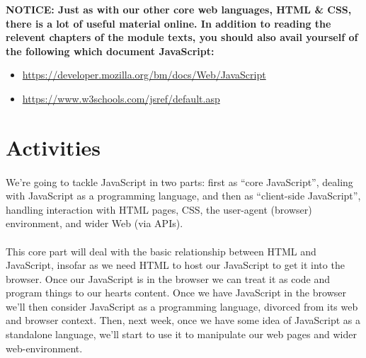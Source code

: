 \documentclass[10pt, a4paper]{article}
\begin{document}
\begin{framed}
{\bf{NOTICE:} Just as with our other core web languages, HTML \& CSS, there is a lot of useful material online. In addition to reading the relevent chapters of the module texts, you should also avail yourself of the following which document JavaScript:
\begin{itemize}
\item \url{https://developer.mozilla.org/bm/docs/Web/JavaScript}
\item \url{https://www.w3schools.com/jsref/default.asp}
\end{itemize}
  }
\end{framed}


\section{Activities}
\paragraph{} We're going to tackle JavaScript in two parts: first as ``core JavaScript'', dealing with JavaScript as a programming language, and then as ``client-side JavaScript'', handling interaction with HTML pages, CSS, the user-agent (browser) environment, and wider Web (via APIs).

\paragraph{} This core part will deal with the basic relationship between HTML and JavaScript, insofar as we need HTML to host our JavaScript to get it into the browser. Once our JavaScript is in the browser we can treat it as code and program things to our hearts content. Once we have JavaScript in the browser we'll then consider JavaScript as a programming language, divorced from its web and browser context. Then, next week, once we have some idea of JavaScript as a standalone language, we'll start to use it to manipulate our web pages and wider web-environment. 
\end{document}
